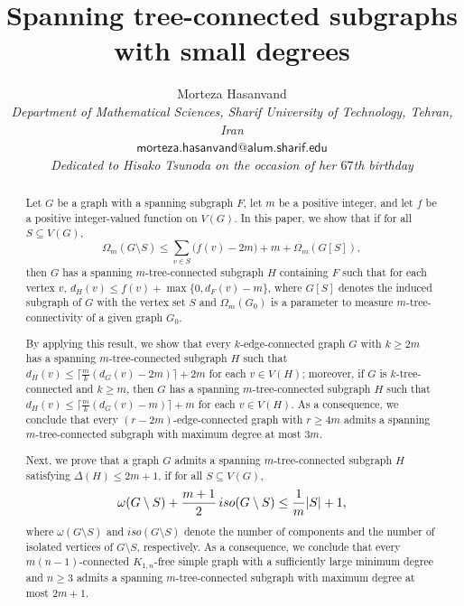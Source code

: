 \documentclass[10pt,bezier]{article}
\title{\bf\Large 
%
Spanning tree-connected subgraphs with small degrees 
}
\author{
{\normalsize{\sc Morteza Hasanvand${}$}}
\vspace{3mm}
\\{\footnotesize{${}$\it Department of Mathematical Sciences, Sharif University of Technology, Tehran, Iran}}
{\footnotesize{}}
\\{\footnotesize{ $\mathsf{morteza.hasanvand@alum.sharif.edu }$ }}
\\{\footnotesize{${}$\it Dedicated to Hisako Tsunoda on the occasion of her $67$th birthday}}
}
\date{}
\begin{document}
\maketitle
%
\begin{abstract}{Let $G$ be a graph with a spanning subgraph $F$, let $m$ be a positive integer, and let $f$ be a positive integer-valued function on $V(G)$. In this paper, we show that if for all $S\subseteq V(G)$, $$\Omega_m(G\setminus S)\le \sum_{v\in S}\big(f(v)-2m\big)+m+\Omega_m(G[S]),$$ then $G$ has a spanning $m$-tree-connected subgraph $H$ containing $F$ such that for each vertex $ v$, $d_H(v)\le f(v)+\max\{0,d_F(v)-m\}$, where $G[S]$ denotes the induced subgraph of $G$ with the vertex set $S$ and $\Omega_m(G_0)$ is a parameter to measure $m$-tree-connectivity of a given graph $G_0$. 

By applying this result, we show that every $k$-edge-connected graph $G$ with $k\ge 2m$ has a spanning $m$-tree-connected subgraph $H$ such that $d_H(v)\le \big\lceil \frac{m}{k}(d_G(v)-2m)\big\rceil+2m$ for each $v\in V(H)$; moreover, if $G$ is $k$-tree-connected and $k\ge m$, then $G$ has a spanning $m$-tree-connected subgraph $H$ such that $d_H(v)\le \big\lceil \frac{m}{k}(d_G(v)-m)\big\rceil+m$ for each $v\in V(H)$. As a consequence, we conclude that every $(r-2m)$-edge-connected graph with $r\ge 4m$ admits a spanning $m$-tree-connected subgraph with maximum degree at most $3m$.

Next, we prove that a graph $G$ admits a spanning $m$-tree-connected subgraph $H$ satisfying $\Delta(H) \le 2m+1$, if for all $S\subseteq V(G)$, $$ \omega(G\setminus S)+\small {\frac{m+1}{2}}\, iso(G\setminus S) \le \frac{1}{m}|S|+1,$$ where $\omega(G\setminus S)$ and $iso(G\setminus S)$ denote the number of components and the number of isolated vertices of $G\setminus S$, respectively. As a consequence, we conclude that every $m(n-1)$-connected $K_{1, n}$-free simple graph with a sufficiently large minimum degree and $n\ge 3$ admits a spanning $m$-tree-connected subgraph with maximum degree at most $2m+1$.
%
%
\\
\\
} {\small
}
\end{abstract}
%
%
%
%
%
%
%
%
%
%
%
%
%
%
\end{document}
